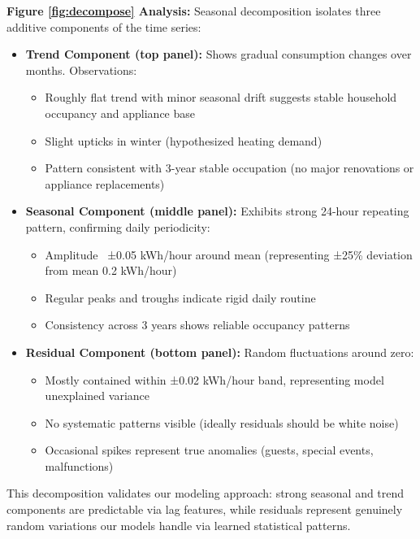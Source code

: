 \documentclass[11pt, a4paper, oneside]{article}
\begin{document}
\textbf{Figure \ref{fig:decompose} Analysis:} Seasonal decomposition isolates three additive components of the time series:

\begin{itemize}
    \item \textbf{Trend Component (top panel):} Shows gradual consumption changes over months. Observations:
    \begin{itemize}
        \item Roughly flat trend with minor seasonal drift suggests stable household occupancy and appliance base
        \item Slight upticks in winter (hypothesized heating demand)
        \item Pattern consistent with 3-year stable occupation (no major renovations or appliance replacements)
    \end{itemize}
    
    \item \textbf{Seasonal Component (middle panel):} Exhibits strong 24-hour repeating pattern, confirming daily periodicity:
    \begin{itemize}
        \item Amplitude ~±0.05 kWh/hour around mean (representing ±25\% deviation from mean 0.2 kWh/hour)
        \item Regular peaks and troughs indicate rigid daily routine
        \item Consistency across 3 years shows reliable occupancy patterns
    \end{itemize}
    
    \item \textbf{Residual Component (bottom panel):} Random fluctuations around zero:
    \begin{itemize}
        \item Mostly contained within ±0.02 kWh/hour band, representing model unexplained variance
        \item No systematic patterns visible (ideally residuals should be white noise)
        \item Occasional spikes represent true anomalies (guests, special events, malfunctions)
    \end{itemize}
\end{itemize}

This decomposition validates our modeling approach: strong seasonal and trend components are predictable via lag features, while residuals represent genuinely random variations our models handle via learned statistical patterns.
\end{document}
